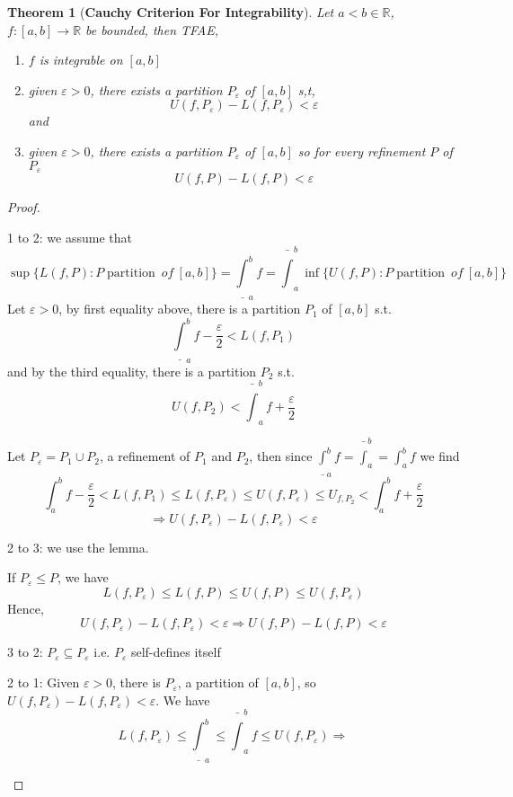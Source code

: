 \documentclass[12pt]{article}
\theoremstyle{plain}
\newtheorem{theorem}{Theorem}[subsection]
\newcommand{\ep}{\varepsilon}
\DeclareMathOperator{\Par}{partition}
\begin{document}
	\newpage
	\begin{theorem}[\textbf{Cauchy Criterion For Integrability}]
		Let $a<b \in \mathbb{R}$, $f:[a,b] \to \mathbb{R}$ be bounded, then 
		TFAE,
		\begin{enumerate}
			\item $f$ is integrable on $[a,b]$
			\item given $\ep > 0$, there exists a partition $P_{\ep}$
				of $[a,b]$ s,t, 
				\[
					U(f,P_{\ep}) - L(f,P_{\ep}) < \ep
				\]
				and
			\item given $\ep>0$, there exists a partition $P_{\ep}$ of $[a,b]$
				so for every refinement $P$ of $P_{\ep}$ 
				\[
					U(f,P) - L(f,P)<\ep
				\]
		\end{enumerate}
	\end{theorem}
	\begin{proof}
		\begin{description}
			\item 1 to 2: we assume that 
				\[
					\sup\{L(f,P): P \Par \ of \ [a,b]\}
					= \underline{\int}_a^b f = \bar{\int}_a^b 
					\inf\{U(f,P): P \Par \ of \ [a,b]\}
				\]
				Let $\ep>0$, by first equality above, there is a partition 
				$P_1$ of $[a,b]$ s.t. 
				\[
					\underline{\int}_a^b f -\frac{\ep}2<L(f,P_1)
				\]
				and by the third equality, there is a partition $P_2$ s.t.
				\[
					U(f,P_2) < \bar{\int}_a^b f+\frac{\ep}2
				\]

				Let $P_{\ep}=P_1\cup P_2$, a refinement of $P_1$ and $P_2$,
				then since $\underline{\int}_a^b f = \bar{\int}_a^b=
				\int_a^b f$ we find   
				\[
					\int_a^b f-\frac{\ep}2 <L(f,P_1) \leq L(f,P_{\ep})\leq 
					U(f,P_{\ep}) \leq U_{f,P_2} < \int_a^b f+\frac{\ep}2
				\]
				\[
					\Rightarrow U(f,P_{\ep})-L(f,P_{\ep})<\ep
				\]
				
			\item 2 to 3: we use the lemma. 

				If $P_{\ep}\leq P$, we have 
				\[
					L(f,P_{\ep})\leq L(f,P)\leq U(f,P)\leq U(f,P_{\ep})
				\]
				Hence, 
				\[
					U(f,P_{\ep}) -L(f,P_{\ep})<\ep\Rightarrow U(f,P)-L(f,P)<\ep
				\]
			\item 3 to 2: $P_{\ep}\subseteq P_{\ep}$ i.e. $P_{\ep}$ 
				self-defines itself
			\item 2 to 1: Given $\ep>0$, there is $P_{\ep}$, a partition of
				$[a,b]$, so $U(f,P_{\ep})-L(f,P_{\ep})<\ep$.
				We have 
				\[
					L(f,P_{\ep})\leq \underline{\int}_a^b \leq \bar{\int}
					_a^b f \leq U(f,P_{\ep}) \Rightarrow 
				\]

		\end{description}
	\end{proof}
\end{document}

